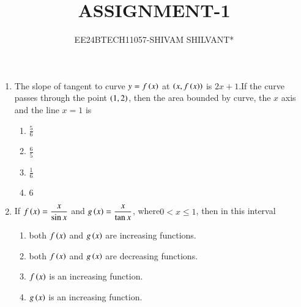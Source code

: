 \documentclass[journal,12pt,twocolumn]{IEEEtran}
\theoremstyle{remark}
\begin{document}

\vspace{3cm}

\title{ASSIGNMENT-1}
\author{EE24BTECH11057-SHIVAM SHILVANT*}
\maketitle
\newpage
\bigskip

\renewcommand{\thefigure}{\theenumi}
\renewcommand{\thetable}{\theenumi}
\begin{enumerate}[start=9]
	\item The slope of tangent to curve $y=f\left(x\right)$ at $\left(x,f\left(x\right)\right)$ is $2x + 1$.If the curve passes through the point $\left(1,2\right)$, then the area bounded by curve, the $x$ axis and the line $x=1$ is
\hfill {}
\begin{enumerate}
    \item $\displaystyle\frac{5}{6}$\\ 
    \item $\displaystyle\frac{6}{5}$\\
    \item $\displaystyle\frac{1}{6}$\\ 
    \item $6$\\
\end{enumerate}
\item If $f\left(x\right)=\displaystyle\frac{x}{\sin{x}}$ and $g\left(x\right)=\displaystyle\frac{x}{\tan{x}}$, where$0<x\leq1$, then in this interval
	\hfill {}
\begin{enumerate}
	\item both $f\left(x\right)$ and $g\left(x\right)$ are increasing functions.
	\item both $f\left(x\right)$ and $g\left(x\right)$ are decreasing functions.
	\item $f\left(x\right)$ is an increasing function.
        \item $g\left(x\right)$ is an increasing function.\\
\end{enumerate}


\end{enumerate}
\end{document}
